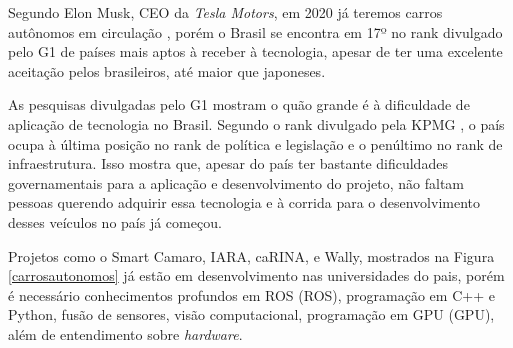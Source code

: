Segundo Elon Musk, CEO da \textit{Tesla Motors}, em 2020 já teremos carros autônomos em circulação \cite{elonmusk}, porém o Brasil se encontra em 17º no rank divulgado pelo G1 \cite{brasilutimorank} de países mais aptos à receber à tecnologia, apesar de ter uma excelente aceitação pelos brasileiros, até maior que japoneses. 

As pesquisas divulgadas pelo G1 \cite{brasilutimorank} mostram o quão grande é à dificuldade de aplicação de tecnologia no Brasil. Segundo o rank divulgado pela KPMG \cite{brasilutimorank}, o país ocupa à última posição no rank de política e legislação e o penúltimo no rank de infraestrutura. Isso mostra que, apesar do país ter bastante dificuldades governamentais para a aplicação e desenvolvimento do projeto, não faltam pessoas querendo adquirir essa tecnologia e à corrida para o desenvolvimento desses veículos no país já começou. 

Projetos como o Smart Camaro, IARA, caRINA, e Wally, mostrados na Figura \ref{carrosautonomos} \cite{carroautonomobrasil} já estão em desenvolvimento nas universidades do pais, porém é necessário conhecimentos profundos em ROS (\acrlong{ROS}), programação em C++ e Python, fusão de sensores, visão computacional, programação em GPU (\acrlong{GPU}), além de entendimento sobre \textit{hardware}.

	\begin{figure}[H]
		\centering
\end{figure}


